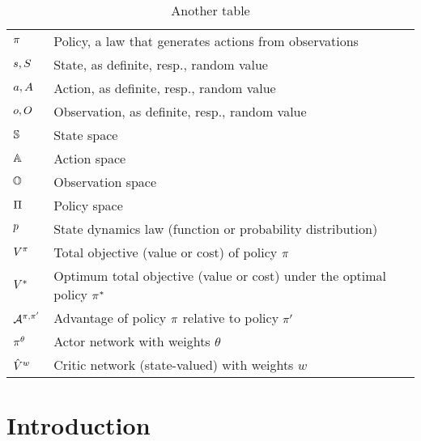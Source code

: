 \documentclass[12pt,twoside]{../../mitthesis}
\begin{document}
\begin{table}
\caption{Another table}
\label{table:my-another-table}
\begin{tabularx}{0.97\textwidth}{ |p{}|p{}| }  
\hline
$\pi$ & Policy, a law that generates actions from observations \\ 
$s, S$ & State, as definite, resp., random value \\ 
$a, A$ & Action, as definite, resp., random value \\ 
$o, O$ & Observation, as definite, resp., random value \\ 
$\mathbb S$ & State space \\
$\mathbb A$ & Action space \\
$\mathbb O$ & Observation space \\
$\Pi$ & Policy space \\
$p$ & State dynamics law (function or probability distribution) \\ 
$V^\pi$ & Total objective (value or cost) of policy $\pi$ \\
$V^*$ & Optimum total objective (value or cost) under the optimal policy $\pi^*$ \\
$\mathcal A^{\pi,\pi'}$ & Advantage of policy $\pi$ relative to policy $\pi'$ \\
$\pi^\theta$ & Actor network with weights $\theta$ \\
$\hat {V}^w$ & Critic network (state-valued) with weights $w$ \\
\hline
\end{tabularx}

\end{table}
\section*{Introduction}
\end{document}
